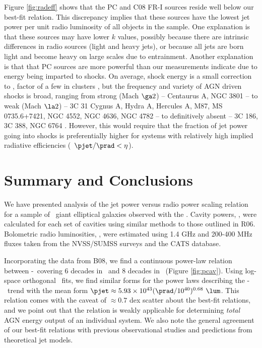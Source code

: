 \documentclass{emulateapj}
\begin{document}
Figure \ref{fig:radeff} shows that the PC and C08 FR-I sources reside
well below our best-fit relation. This discrepancy implies that these
sources have the lowest jet power per unit radio luminosity of all
objects in the sample. One explanation is that these sources may have
lower $k$ values, possibly because there are intrinsic differences in
radio sources (light and heavy jets), or because all jets are born
light and become heavy on large scales due to entrainment. Another
explanation is that that PC sources are more powerful than our
measurements indicate due to energy being imparted to shocks. On
average, shock energy is a small correction to \pcav, factor of a few
in clusters \citep{mcnamrev}, but the frequency and variety of AGN
driven shocks is broad, ranging from strong (Mach $\ga 2$) --
Centaurus A, NGC 3801 \citep{2003ApJ...592..129K, 2009MNRAS.395.1999C,
2007ApJ...660..191C} -- to weak (Mach $\la 2$) -- 3C 31 Cygnus A,
Hydra A, Hercules A, M87, MS 0735.6+7421, NGC 4552, NGC 4636, NGC 4782
\citep{2002MNRAS.336.1161L, 2006ApJ...644L...9W, hydraa, herca,
2007ApJ...665.1057F, ms0735, 2006ApJ...648..947M, 2009arXiv0909.2942B,
2007ApJ...664..804M} -- to definitively absent -- 3C 186, 3C 388, NGC
6764 \citep{2008ApJ...684..811S, 2006ApJ...639..753K,
2008ApJ...688..190C}. However, this would require that the fraction of
jet power going into shocks is preferentially higher for systems with
relatively high implied radiative efficiencies (\ie\ $\pjet/\prad <
\eta$).

\section{Summary and Conclusions}
\label{sec:summary}

We have presented analysis of the jet power versus radio power scaling
relation for a sample of \samp\ giant elliptical galaxies observed
with the \cxo. Cavity powers, \pjet, were calculated for each set of
cavities using similar methods to those outlined in R06. Bolometric
radio luminosities, \prad, were estimated using 1.4 GHz and 200-400
MHz fluxes taken from the NVSS/SUMSS surveys and the CATS database.

Incorporating the data from B08, we find a continuous power-law
relation between \pjet-\prad\ covering 6 decades in \prad\ and 8
decades in \pjet\ (Figure \ref{fig:pcav}). Using log-space orthogonal
\bces\ fits, we find similar forms for the power laws describing the
\pjet-\prad\ trend with the mean form $\pjet \approx 5.93\times10^{43}
(\prad/10^{40})^{0.68} ~\lum$. This relation comes with the caveat of
$\approx 0.7$ dex scatter about the best-fit relations, and we point
out that the relation is weakly applicable for determining
{\it{total}} AGN energy output of an individual system. We also note
the general agreement of our best-fit relations with previous
observational studies and predictions from theoretical jet models.
\end{document}
